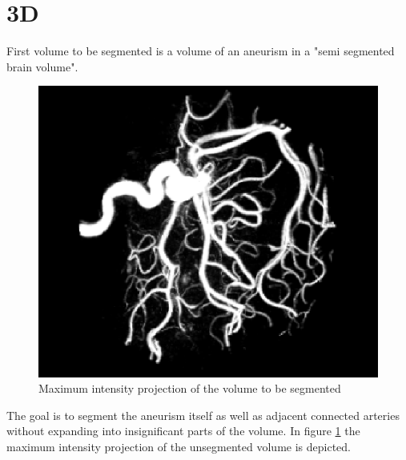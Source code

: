 \section{3D}
First volume to be segmented is a volume of an aneurism in a "semi segmented brain volume". 
\begin{figure}[h!]
\centering
\includegraphics[width=.9\textwidth]{results/3D/3D-aneurism-unsegmented/aneurism_original_mip}
\caption{Maximum intensity projection of the volume to be segmented}
\label{aneurismOriginal}
\end{figure}
The goal is to segment the aneurism itself as well as adjacent connected arteries without expanding into insignificant parts of the volume. In figure \ref{aneurismOriginal} the maximum intensity projection of the unsegmented volume is depicted. 

